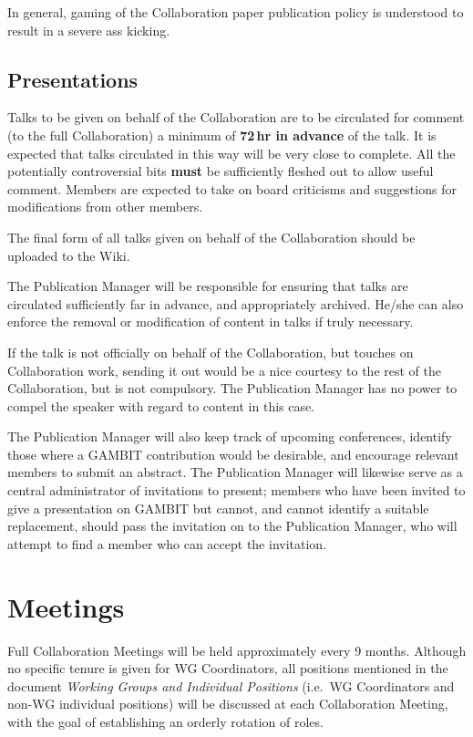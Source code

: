 In general, gaming of the Collaboration paper publication policy is understood to result in a severe ass kicking.

\subsection{Presentations}

Talks to be given on behalf of the Collaboration are to be circulated for comment (to the full Collaboration) a minimum of \textbf{72\,hr in advance} of the talk.  It is expected that talks circulated in this way will be very close to complete.  All the potentially controversial bits \textbf{must} be sufficiently fleshed out to allow useful comment.  Members are expected to take on board criticisms and suggestions for modifications from other members.  

The final form of all talks given on behalf of the Collaboration should be uploaded to the Wiki.

The Publication Manager will be responsible for ensuring that talks are circulated sufficiently far in advance, and appropriately archived.  He/she can also enforce the removal or modification of content in talks if truly necessary.

If the talk is not officially on behalf of the Collaboration, but touches on Collaboration work, sending it out would be a nice courtesy to the rest of the Collaboration, but is not compulsory.  The Publication Manager has no power to compel the speaker with regard to content in this case.

The Publication Manager will also keep track of upcoming conferences, identify those where a GAMBIT contribution would be desirable, and encourage relevant members to submit an abstract.  The Publication Manager will likewise serve as a central administrator of invitations to present; members who have been invited to give a presentation on GAMBIT but cannot, and cannot identify a suitable replacement, should pass the invitation on to the Publication Manager, who will attempt to find a member who can accept the invitation.


\section{Meetings}

Full Collaboration Meetings will be held approximately every 9 months.  Although no specific tenure is given for WG Coordinators, all positions mentioned in the document \textit{Working Groups and Individual Positions} (i.e.\ WG Coordinators and non-WG individual positions) will be discussed at each Collaboration Meeting, with the goal of establishing an orderly rotation of roles.

